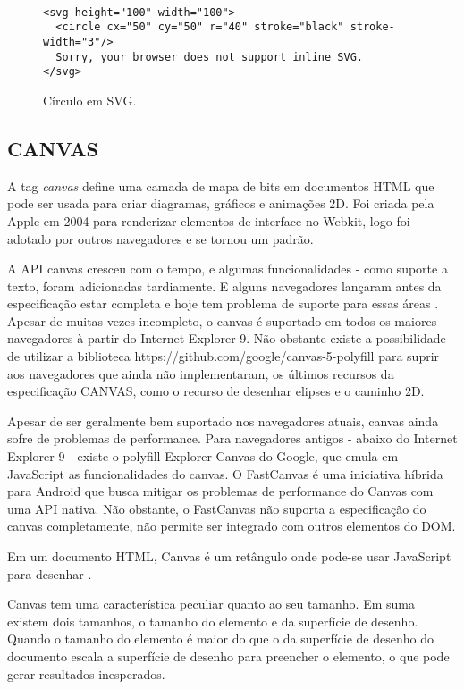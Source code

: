 \begin{figure}
\centering
\begin{verbatim}

<svg height="100" width="100">
  <circle cx="50" cy="50" r="40" stroke="black" stroke-width="3"/>
  Sorry, your browser does not support inline SVG.
</svg>

\end{verbatim}
\caption{Círculo em SVG.}
\end{figure}
\subsection{CANVAS}

A tag \textit{canvas} define uma camada de mapa de bits em documentos
HTML que pode ser usada para criar diagramas, gráficos e animações
2D. Foi criada pela Apple em 2004 para renderizar elementos de interface
no Webkit, logo foi adotado por outros navegadores e se tornou um
padrão.

A API canvas cresceu com o tempo, e algumas funcionalidades - como
suporte a texto, foram adicionadas tardiamente. E alguns navegadores
lançaram antes da especificação estar completa e hoje tem problema
de suporte para essas áreas \autocite{diveIntohtml}. Apesar de muitas
vezes incompleto, o canvas é suportado em todos os maiores navegadores
à partir do Internet Explorer 9. Não obstante existe a possibilidade de utilizar
a biblioteca https://github.com/google/canvas-5-polyfill para
suprir aos navegadores que ainda não implementaram, os últimos recursos
da especificação CANVAS, como o recurso de desenhar elipses e o caminho 2D.

Apesar de ser geralmente bem suportado nos navegadores atuais, canvas
ainda sofre de problemas de performance. Para navegadores antigos -
abaixo do Internet Explorer 9 - existe o polyfill Explorer Canvas
do Google, que emula em JavaScript as funcionalidades do canvas. O
FastCanvas é uma iniciativa híbrida para Android que busca mitigar os
problemas de performance do Canvas com uma API nativa. Não obstante, o
FastCanvas não suporta a especificação do canvas completamente, não
permite ser integrado com outros elementos do DOM.

Em um documento HTML, Canvas é um retângulo onde pode-se usar
JavaScript para desenhar \autocite[pp. 113]{diveIntohtml}.

Canvas tem uma característica peculiar quanto ao seu tamanho.
Em suma existem dois tamanhos, o tamanho do elemento e da superfície de
desenho. Quando o tamanho do elemento é maior do que o da superfície
de desenho do documento escala a superfície de desenho para preencher o
elemento, o que pode gerar resultados inesperados.

